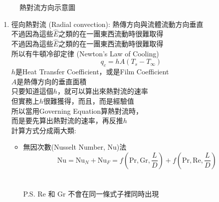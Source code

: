 \documentclass[../main.tex]{subfiles}
\begin{document}
\begin{itemize}
\begin{itemize}
\begin{itemize}
\begin{figure}[H]
          \caption{熱對流方向示意圖}
        \end{figure}
        \begin{enumerate}
          \item 徑向熱對流 (Radial convection): 熱傳方向與流體流動方向垂直\\
          不過因為這些$\hat E$之類的在一團東西流動時很難取得\\
          不過因為這些$\hat E$之類的在一團東西流動時很難取得\\
          所以有牛頓冷卻定律 (Newton's Law of Cooling)
          \begin{equation}
            q_c = hA\left(T_s - T_\infty\right)
          \end{equation}
          $h$是Heat Transfer Coefficient，或是Film Coefficient\\
          $A$是熱傳方向的垂直面積\\
          只要知道這個$h$，就可以算出來熱對流的速率\\
          但實務上$h$很難獲得，而且，而是經驗值\\
          所以當用Governing Equation算熱對流時，\\
          而是要先算出熱對流的速率，再反推$h$\\
          計算方式分成兩大類:
          \begin{itemize}
            \item 無因次數(Nusselt Number, $\text{Nu}$)法
            \begin{equation}
              \text{Nu} = \text{Nu}_N + \text{Nu}_F = 
              f(\text{Pr}, \text{Gr}, \frac{L}{D}) + f(\text{Pr}, \text{Re}, \frac{L}{D})
            \end{equation}
            \\
            \\
            P.S. Re 和 Gr 不會在同一條式子裡同時出現\\

\end{itemize}
\end{enumerate}
\end{itemize}
\end{itemize}
\end{itemize}
\end{document}
